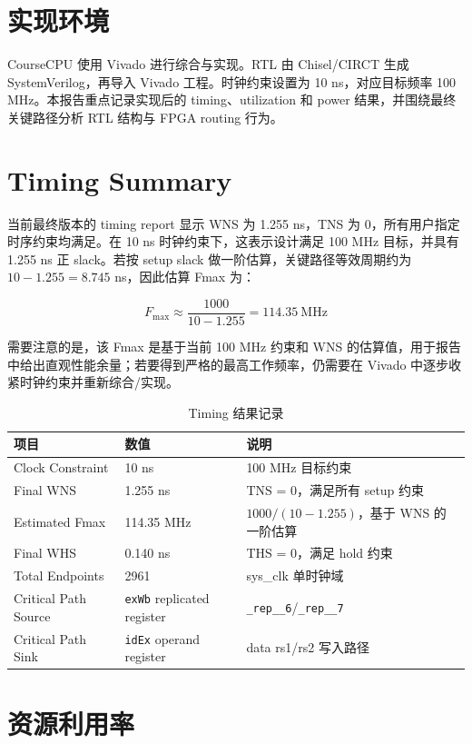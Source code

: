 \documentclass[UTF8,a4paper,12pt]{ctexrep}
\begin{document}
\section{实现环境}

CourseCPU 使用 Vivado 进行综合与实现。RTL 由 Chisel/CIRCT 生成 SystemVerilog，再导入 Vivado 工程。时钟约束设置为 10 ns，对应目标频率 100 MHz。本报告重点记录实现后的 timing、utilization 和 power 结果，并围绕最终关键路径分析 RTL 结构与 FPGA routing 行为。

\section{Timing Summary}

当前最终版本的 timing report 显示 WNS 为 1.255 ns，TNS 为 0，所有用户指定时序约束均满足。在 10 ns 时钟约束下，这表示设计满足 100 MHz 目标，并具有 1.255 ns 正 slack。若按 setup slack 做一阶估算，关键路径等效周期约为 $10 - 1.255 = 8.745$ ns，因此估算 Fmax 为：

\[
  F_{\max} \approx \frac{1000}{10 - 1.255} = 114.35\ \text{MHz}
\]

需要注意的是，该 Fmax 是基于当前 100 MHz 约束和 WNS 的估算值，用于报告中给出直观性能余量；若要得到严格的最高工作频率，仍需要在 Vivado 中逐步收紧时钟约束并重新综合/实现。

\begin{table}[htbp]
  \centering
  \caption{Timing 结果记录}
  \begin{tabularx}{\textwidth}{lXX}
    \toprule
    项目 & 数值 & 说明 \\
    \midrule
    Clock Constraint & 10 ns & 100 MHz 目标约束 \\
    Final WNS & 1.255 ns & TNS = 0，满足所有 setup 约束 \\
    Estimated Fmax & 114.35 MHz & $1000/(10-1.255)$，基于 WNS 的一阶估算 \\
    Final WHS & 0.140 ns & THS = 0，满足 hold 约束 \\
    Total Endpoints & 2961 & sys\_clk 单时钟域 \\
    Critical Path Source & \texttt{exWb} replicated register & \texttt{\_rep\_\_6}/\texttt{\_rep\_\_7} \\
    Critical Path Sink & \texttt{idEx} operand register & data rs1/rs2 写入路径 \\
    \bottomrule
  \end{tabularx}
\end{table}

\section{资源利用率}
\end{document}
